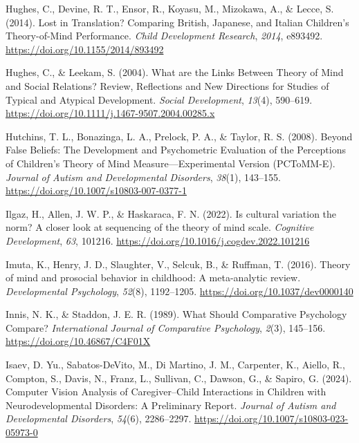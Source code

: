 \documentclass[
]{scrbook}
\newlength{\cslhangindent}
\newenvironment{CSLReferences}[2] %
 {\begin{list}{}{%
  \setlength{\itemindent}{0pt}
  \setlength{\leftmargin}{0pt}
  \setlength{\parsep}{0pt}
  \ifodd #1
   \setlength{\leftmargin}{\cslhangindent}
   \setlength{\itemindent}{-1\cslhangindent}
  \fi
  \setlength{\itemsep}{#2\baselineskip}}}
 {\end{list}}
\begin{document}
\begin{CSLReferences}{1}{0}
Hughes, C., Devine, R. T., Ensor, R., Koyasu, M., Mizokawa, A., \& Lecce, S. (2014). Lost in {Translation}? {Comparing British}, {Japanese}, and {Italian Children}'s {Theory-of-Mind Performance}. \emph{Child Development Research}, \emph{2014}, e893492. \url{https://doi.org/10.1155/2014/893492}

Hughes, C., \& Leekam, S. (2004). What are the {Links Between Theory} of {Mind} and {Social Relations}? {Review}, {Reflections} and {New Directions} for {Studies} of {Typical} and {Atypical Development}. \emph{Social Development}, \emph{13}(4), 590--619. \url{https://doi.org/10.1111/j.1467-9507.2004.00285.x}

Hutchins, T. L., Bonazinga, L. A., Prelock, P. A., \& Taylor, R. S. (2008). Beyond {False Beliefs}: {The Development} and {Psychometric Evaluation} of the {Perceptions} of {Children}'s {Theory} of {Mind Measure}---{Experimental Version} ({PCToMM-E}). \emph{Journal of Autism and Developmental Disorders}, \emph{38}(1), 143--155. \url{https://doi.org/10.1007/s10803-007-0377-1}

Ilgaz, H., Allen, J. W. P., \& Haskaraca, F. N. (2022). Is cultural variation the norm? {A} closer look at sequencing of the theory of mind scale. \emph{Cognitive Development}, \emph{63}, 101216. \url{https://doi.org/10.1016/j.cogdev.2022.101216}

Imuta, K., Henry, J. D., Slaughter, V., Selcuk, B., \& Ruffman, T. (2016). Theory of mind and prosocial behavior in childhood: {A} meta-analytic review. \emph{Developmental Psychology}, \emph{52}(8), 1192--1205. \url{https://doi.org/10.1037/dev0000140}

Innis, N. K., \& Staddon, J. E. R. (1989). What {Should Comparative Psychology Compare}? \emph{International Journal of Comparative Psychology}, \emph{2}(3), 145--156. \url{https://doi.org/10.46867/C4F01X}

Isaev, D. Yu., Sabatos-DeVito, M., Di Martino, J. M., Carpenter, K., Aiello, R., Compton, S., Davis, N., Franz, L., Sullivan, C., Dawson, G., \& Sapiro, G. (2024). Computer {Vision Analysis} of {Caregiver}--{Child Interactions} in {Children} with {Neurodevelopmental Disorders}: {A Preliminary Report}. \emph{Journal of Autism and Developmental Disorders}, \emph{54}(6), 2286--2297. \url{https://doi.org/10.1007/s10803-023-05973-0}


\end{CSLReferences}
\end{document}

